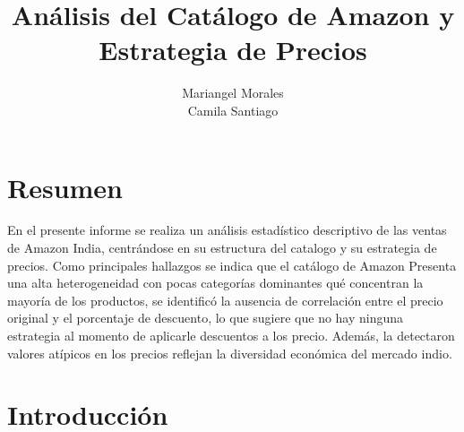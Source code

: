\documentclass[oneside,11pt]{Latex/Classes/PhDthesisPSnPDF}
\title{Análisis del Catálogo de Amazon y Estrategia de Precios}
\author{Mariangel Morales \\ Camila Santiago}
\begin{document}
\maketitle

\frontmatter


\setcounter{secnumdepth}{3}
\setcounter{tocdepth}{3}

\tableofcontents



\cleardoublepage

  \cleardoublepage       %
  \chapter*{Resumen}     %
  
  En el presente informe se realiza un análisis estadístico descriptivo
de las ventas de Amazon India, centrándose en su estructura del catalogo
y su estrategia de precios. Como principales hallazgos se indica que el
catálogo de Amazon Presenta una alta heterogeneidad con pocas categorías
dominantes qué concentran la mayoría de los productos, se identificó la
ausencia de correlación entre el precio original y el porcentaje de
descuento, lo que sugiere que no hay ninguna estrategia al momento de
aplicarle descuentos a los precio. Además, la detectaron valores
atípicos en los precios reflejan la diversidad económica del mercado
indio.             %
  
  \cleardoublepage

\mainmatter
\def\baselinestretch{1.5}

\chapter*{Introducción}
\end{document}
